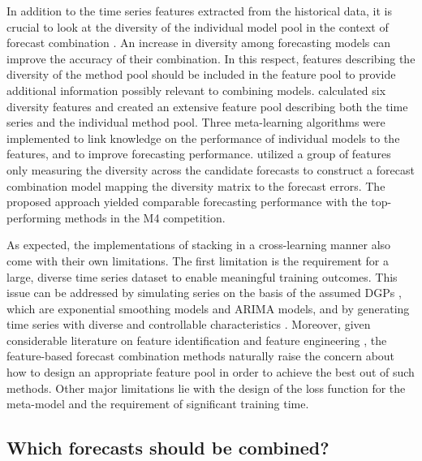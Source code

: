 \documentclass[11pt]{article}
\newcommand{\pkg}[1]{{\normalfont\fontseries{b}\selectfont #1}}
\let\proglang=\textsf
\begin{document}
In addition to the time series features extracted from the historical data, it is crucial to look at the diversity of the individual model pool in the context of forecast combination \citep{Batchelor1995-ps,Thomson2019-al,Atiya2020-ge,Lichtendahl2020-ut}. An increase in diversity among forecasting models can improve the accuracy of their combination. In this respect, features describing the diversity of the method pool should be included in the feature pool to provide additional information possibly relevant to combining models. \cite{Lemke2010-wn} calculated six diversity features and created an extensive feature pool describing both the time series and the individual method pool. Three meta-learning algorithms were implemented to link knowledge on the performance of individual models to the features, and to improve forecasting performance. \cite{Kang2021-ol} utilized a group of features only measuring the diversity across the candidate forecasts to construct a forecast combination model mapping the diversity matrix to the forecast errors. The proposed approach yielded comparable forecasting performance with the top-performing methods in the M4 competition.

As expected, the implementations of stacking in a cross-learning manner also come with their own limitations. The first limitation is the requirement for a large, diverse time series dataset to enable meaningful training outcomes. This issue can be addressed by simulating series on the basis of the assumed DGPs \citep{talagala2018meta} \citep[implemented using the \proglang{R} package \pkg{forecast},][]{rforecast}, which are exponential smoothing models and ARIMA models, and by generating time series with diverse and controllable characteristics \citep{Kang2020-rl} \citep[implemented in the \proglang{R} package \pkg{gratis},][]{rgratis}. Moreover, given considerable literature on feature identification and feature engineering \citep[e.g.,][]{Wang2009-hs,Kang2017-wt,Lemke2010-wn,Montero-Manso2020-tq,Li2020-od}, the feature-based forecast combination methods naturally raise the concern about how to design an appropriate feature pool in order to achieve the best out of such methods. Other major limitations lie with the design of the loss function for the meta-model and the requirement of significant training time.

\subsection{Which forecasts should be combined?}
\label{sec:which_forecasts_should_be_combined}
\end{document}

